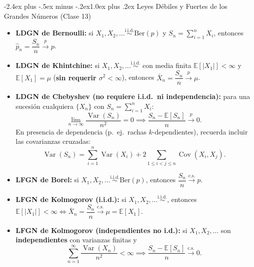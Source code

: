 \documentclass[10pt,a4paper]{article}
\makeatletter
\newcommand{\E}{\mathbb{E}}
\newcommand{\Var}{\operatorname{Var}}
\newcommand{\Cov}{\operatorname{Cov}}
\newcommand{\iid}{\overset{\text{i.i.d.}}{\sim}}
\newcommand{\pto}{\xrightarrow{\;p\;}}
\newcommand{\dcs}{\xrightarrow{\mathrm{c.s.}}}
\renewcommand\section{\@startsection{section}{1}{0pt}%
  {-2.4ex plus -.5ex minus -.2ex}{1.0ex plus .2ex}%
  {\normalfont\large\bfseries\color{seccolor}}}
\makeatother
\begin{document}
\section{Leyes Débiles y Fuertes de los Grandes Números \textmd{(Clase 13)}}

\begin{thmbox}[frametitle={Leyes Débiles de los Grandes Números (LDGN · convergencia en probabilidad $\pto$)}]
\begin{itemize}
  \item \textbf{LDGN de Bernoulli:} si $X_1, X_2, \dots \iid \text{Ber}(p)$ y $S_n = \sum_{i=1}^n X_i$, entonces $\hat p_n = \dfrac{S_n}{n} \pto p$.
  \item \textbf{LDGN de Khintchine:} si $X_1, X_2, \dots \iid$ con media finita $\E[|X_1|] < \infty$ y $\E[X_1] = \mu$ (\textbf{sin requerir $\sigma^2 < \infty$}), entonces $\bar X_n = \dfrac{S_n}{n} \pto \mu$.
  \item \textbf{LDGN de Chebyshev (no requiere i.i.d.\ ni independencia):} para una sucesión cualquiera $\{X_n\}$ con $S_n = \sum_{i=1}^n X_i$:
  \[
  \lim_{n\to\infty} \frac{\Var(S_n)}{n^2} = 0 \implies \frac{S_n - \E[S_n]}{n} \pto 0.
  \]
  En presencia de dependencia (p.\ ej.\ rachas $k$-dependientes), recuerda incluir las covarianzas cruzadas:
  \[
  \Var(S_n) = \sum_{i=1}^n \Var(X_i) + 2\sum_{1 \le i < j \le n} \Cov(X_i, X_j).
  \]
\end{itemize}
\end{thmbox}

\begin{thmbox}[frametitle={Leyes Fuertes de los Grandes Números (LFGN · convergencia casi segura $\dcs$)}]
\begin{itemize}
  \item \textbf{LFGN de Borel:} si $X_1, X_2, \dots \iid \text{Ber}(p)$, entonces $\dfrac{S_n}{n} \dcs p$.
  \item \textbf{LFGN de Kolmogorov (i.i.d.):} si $X_1, X_2, \dots \iid$, entonces $\E[|X_1|] < \infty \iff \bar X_n = \dfrac{S_n}{n} \dcs \mu = \E[X_1]$.
  \item \textbf{LFGN de Kolmogorov (independientes no i.d.):} si $X_1, X_2, \dots$ son \textbf{independientes} con varianzas finitas y
  \[
  \sum_{n=1}^\infty \frac{\Var(X_n)}{n^2} < \infty \implies \frac{S_n - \E[S_n]}{n} \dcs 0.
  \]
\end{itemize}
\end{thmbox}
\end{document}

